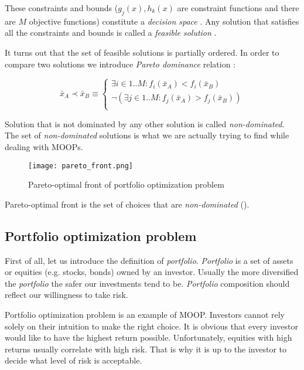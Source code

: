 These constraints and bounds ($g_{j}(x) , h_{k}(x) $ are constraint functions and there are $M$ objective functions) constitute a \emph{decision space}  
\cite{Deb:2001:MOU:559152}.
Any solution that satisfies all the constraints and bounds is called a \emph{feasible solution} \cite{Deb:2001:MOU:559152}.

It turns out that the set of feasible solutions is partially ordered.
In order to compare two solutions we introduce \emph{Pareto dominance} relation \cite{Phd}:

\begin{equation}
\bar{x}_{A}  \prec \bar{x}_{B} \equiv
      \begin{cases}
     \exists{i \in 1..M} : f_{i}(\bar{x}_{A}) < f_{i}(\bar{x}_{B}) \\
     \neg (\exists{j \in 1..M} : f_{j}(\bar{x}_{A}) > f_{j}(\bar{x}_{B}))  \\ 
			  
      
\end{cases} 
\end{equation}

Solution that is not dominated by any other solution is called \emph{non-dominated}. 
The set of \emph{non-dominated} solutions is what we are actually trying to find while dealing with MOOPs.



\begin{figure}[ht]
  \begin{center}
    \texttt{[image: pareto\_front.png]}
  \end{center}
  \caption{Pareto-optimal front of portfolio optimization problem}
\end{figure}


Pareto-optimal front is the set of choices that are \emph{non-dominated} (\cite{Dre}).
 

\subsection{Portfolio optimization problem}

First of all, let us introduce the definition of \emph{portfolio}.
	\emph{Portfolio} is a set of assets or equities (e.g. stocks, bonds) owned by an investor.
	Usually the more diversified the  \emph{portfolio} the safer our investments tend to be.
	\emph{Portfolio} composition should reflect our willingness to take risk.

Portfolio optimization problem is an example of MOOP.
Investors cannot rely solely on their intuition to make the right choice.
It is obvious that every investor would like to have the highest return possible.
Unfortunately, equities with high returns usually correlate with high risk. 
That is why it is up to the investor to decide what level of risk is acceptable.

